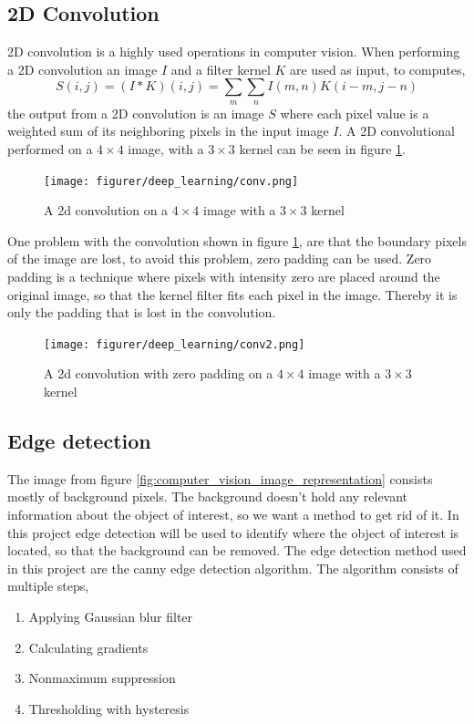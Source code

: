 \documentclass[11pt]{article}
\begin{document}
\subsection{2D Convolution}\label{sec:computer_vision_convolution}

2D convolution is a highly used operations in computer vision. When performing a 2D convolution an image $I$ and a filter kernel $K$ are used as input, to computes,
\begin{equation}\label{eq:computer_vision_conv}
    S(i, j) = (I \ast K)(i, j) = \sum_{m} \sum_{n} I(m, n) K(i - m, j - n)
\end{equation}
the output from a 2D convolution is an image $S$ where each pixel value is a weighted sum of its neighboring pixels in the input image $I$. A 2D convolutional performed on a $4 \times 4$ image, with a $3 \times 3$ kernel can be seen in figure \ref{fig:computer_vision_conv2}.
\begin{figure}[!h]
    \centering
    \texttt{[image: figurer/deep\_learning/conv.png]}
    \caption{A 2d convolution on a $4 \times 4$ image with a $3 \times 3$ kernel}
    \label{fig:computer_vision_conv2}
\end{figure}
One problem with the convolution shown in figure \ref{fig:computer_vision_conv2}, are that the boundary pixels of the image are lost, to avoid this problem, zero padding can be used. Zero padding is a technique where pixels with intensity zero are placed around the original image, so that the kernel filter fits each pixel in the image. Thereby it is only the padding that is lost in the convolution.
\begin{figure}[!h]
    \centering
    \texttt{[image: figurer/deep\_learning/conv2.png]}
    \caption{A 2d convolution with zero padding on a $4 \times 4$ image with a $3 \times 3$ kernel}
    \label{fig:computer_vison_conv_zero_padding}
\end{figure}

\subsection{Edge detection}\label{sec:computer_vision_edge_detection}

The image from figure \ref{fig:computer_vision_image_representation} consists mostly of background pixels. The background doesn't hold any relevant information about the object of interest, so we want a method to get rid of it. In this project edge detection will be used to identify where the object of interest is located, so that the background can be removed. The edge detection method used in this project are the canny edge detection algorithm. The algorithm consists of multiple steps,
\begin{enumerate}
    \item Applying Gaussian blur filter
    \item Calculating gradients
    \item Nonmaximum suppression
    \item Thresholding with hysteresis
\end{enumerate}
\end{document}
